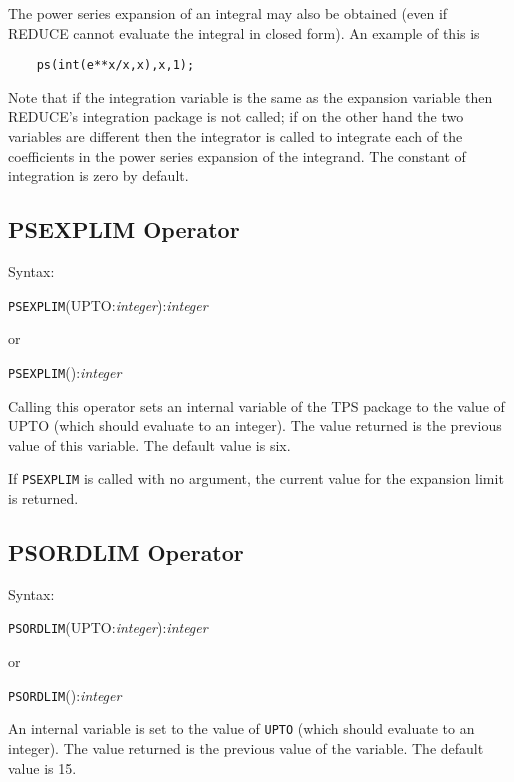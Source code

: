 The power series expansion of an integral may also be obtained (even if
REDUCE cannot evaluate the integral in closed form).  An example of
this is

\begin{verbatim}
    ps(int(e**x/x,x),x,1);
\end{verbatim}

Note that if the integration variable is the same as the expansion
variable then REDUCE's integration package is not called; if on the
other hand the two variables are different then the integrator is
called to integrate each of the coefficients in the power series
expansion of the integrand.  The constant of integration is zero by
default.

\subsection{PSEXPLIM Operator}

Syntax:

\hspace*{2em} {\tt PSEXPLIM}(UPTO:{\em integer}):{\em integer}

\hspace*{4em} or

\hspace*{2em} {\tt PSEXPLIM}():{\em integer}

Calling this operator sets an internal variable of the
TPS package to the value of UPTO (which should evaluate to an integer).
The value returned is the previous value of this variable.
The default value is six.

If {\tt PSEXPLIM} is called with no argument, the current value for
the expansion limit is returned.


\subsection{PSORDLIM Operator}

Syntax:

\hspace*{2em} {\tt PSORDLIM}(UPTO:{\em integer}):{\em integer}

\hspace*{4em} or

\hspace*{2em} {\tt PSORDLIM}():{\em integer}

An internal variable is set to the value of {\tt UPTO} (which should
evaluate to an integer). The value returned is the previous value of
the variable.  The default value is 15.

